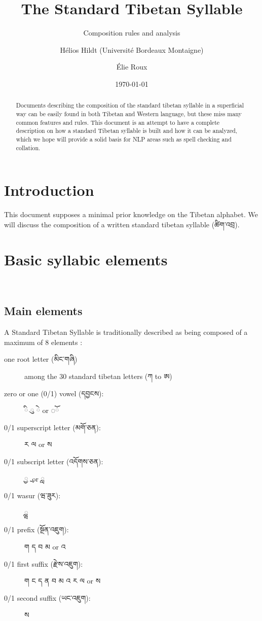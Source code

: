 \documentclass[%
a4paper,%
pagesize,%
12pt,%
parskip=off,%
bibliography=totoc,%
numbers=noenddot,%
DIV=12,%
twoside=semi,%
headings=normal%
]{scrartcl}
\title{The Standard Tibetan Syllable}
\subtitle{Composition rules and analysis}
\author{Hélios Hildt (Université Bordeaux Montaigne) \and Élie Roux}
\date{\today}
\begin{document}
\maketitle

\begin{abstract}
Documents describing the composition of the standard tibetan syllable in a superficial way can be easily found in both Tibetan and Western language, but these miss many common features and rules. This document is an attempt to have a complete description on how a standard Tibetan syllable is built and how it can be analyzed, which we hope will provide a solid basis for NLP areas such as spell checking and collation.
\end{abstract}


\tableofcontents

\newpage

\section*{Introduction}

This document supposes a minimal prior knowledge on the Tibetan alphabet. We will discuss the composition of a written standard tibetan syllable (ཚིག་འབྲ).

\section{Basic syllabic elements}

­\subsection{Main elements}

A Standard Tibetan Syllable is traditionally described as being composed of a maximum of 8 elements :

\begin{description}
  \item[one root letter (མིང་གཞི)] among the 30 standard tibetan letters (ཀ to ཨ)
  \item[zero or one (0/1) vowel (དབྱངས):] {\tibetanfont ◌}ི {\tibetanfont ◌\kern 0.5mm}ུ {\tibetanfont ◌}ེ or {\tibetanfont ◌}ོ
  \item[0/1 superscript letter (མགོ་ཅན):] ར ལ or ས
  \item[0/1 subscript letter (འདོགས་ཅན):] ྱ ྲ or ླ
  \item[0/1 wasur (ཝ་ཟུར):] ྺ
  \item[0/1 prefix (སྔོན་འཇུག):] ག ད བ མ or འ
  \item[0/1 first suffix (རྫེས་འཇུག):] ག ང ད ན བ མ འ ར ལ or ས
  \item[0/1 second suffix (ཡང་འཇུག):] ས
\end{description}
\end{document}
